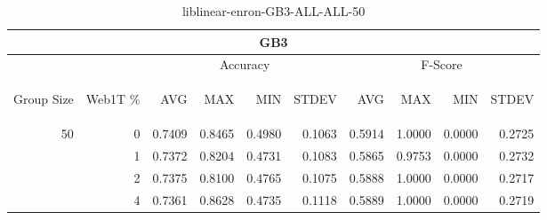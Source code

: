 \begin{center}
\begin{table}[htbp]
\begin{tabular}{ | r | r | r | r | r | r | r | r | r | r |}
\hline
\multicolumn{10}{|c|}{GB3}\\
\hline
 & & \multicolumn{4}{|c|}{Accuracy} & \multicolumn{4}{|c|}{F-Score}\\ \cline{3-10}
\begin{sideways}Group Size\end{sideways} & \begin{sideways}Web1T \%\end{sideways} & \begin{sideways}AVG\end{sideways} & \begin{sideways}MAX\end{sideways} & \begin{sideways}MIN\end{sideways} & \begin{sideways}STDEV\end{sideways} & \begin{sideways}AVG\end{sideways} & \begin{sideways}MAX\end{sideways} & \begin{sideways}MIN\end{sideways} & \begin{sideways}STDEV\end{sideways}\\
\hline
\multirow{4}{*}{50}
 & 0 & 0.7409 & 0.8465 & 0.4980 & 0.1063 & 0.5914 & 1.0000 & 0.0000 & 0.2725\\ \cline{2-10}
 & 1 & 0.7372 & 0.8204 & 0.4731 & 0.1083 & 0.5865 & 0.9753 & 0.0000 & 0.2732\\ \cline{2-10}
 & 2 & 0.7375 & 0.8100 & 0.4765 & 0.1075 & 0.5888 & 1.0000 & 0.0000 & 0.2717\\ \cline{2-10}
 & 4 & 0.7361 & 0.8628 & 0.4735 & 0.1118 & 0.5889 & 1.0000 & 0.0000 & 0.2719\\ \cline{2-10}
\hline
\end{tabular}
\caption{liblinear-enron-GB3-ALL-ALL-50}
\end{table}
\end{center}

